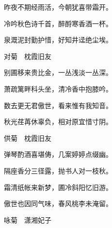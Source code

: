 \begin{poem}
\begin{pl}
        昨夜不期经雨活，今朝犹喜带霜开。
    \end{pl}
    \begin{pl}

        冷吟秋色诗千首，醉酹寒香酒一杯。
    \end{pl}
    \begin{pl}

        泉溉泥封勤护惜，好知井迳绝尘埃。
    \end{pl}

    \emptypl
    \begin{pl}

        对菊　枕霞旧友
    \end{pl}
    \begin{pl}

        别圃移来贵比金，一丛浅淡一丛深。
    \end{pl}
    \begin{pl}

        萧疏篱畔科头坐，清冷香中抱膝吟。
    \end{pl}
    \begin{pl}

        数去更无君傲世，看来惟有我知音。
    \end{pl}
    \begin{pl}

        秋光荏苒休辜负，相对原宜惜寸阴。
    \end{pl}

    \emptypl
    \begin{pl}

        供菊　枕霞旧友
    \end{pl}
    \begin{pl}

        弹琴酌酒喜堪俦，几案婷婷点缀幽。
    \end{pl}
    \begin{pl}

        隔座香分三径露，抛书人对一枝秋。
    \end{pl}
    \begin{pl}

        霜清纸帐来新梦，圃冷斜阳忆旧游。
    \end{pl}
    \begin{pl}

        傲世也因同气味，春风桃李未淹留。
    \end{pl}
    \emptypl
    \begin{pl}

        咏菊　潇湘妃子
    \end{pl}
    \begin{pl}


\end{pl}
\end{poem}
